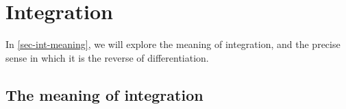 \documentclass[a4paper]{book}
\theoremstyle{definition}
\begin{document}


\chapter{Integration}
\label{chap-int}

In \autoref{sec-int-meaning}, we will explore the meaning of
integration, and the precise sense in which it is the reverse of
differentiation.  

\section{The meaning of integration}
\label{sec-int-meaning}
\end{document}

